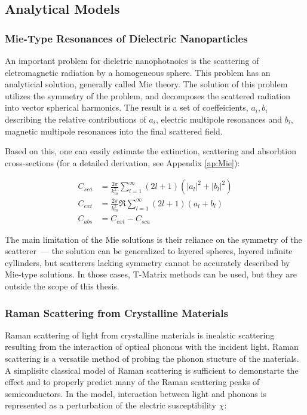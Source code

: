     \subsection{Analytical Models}
        \subsubsection{Mie-Type Resonances of Dielectric Nanoparticles}
                An important problem for dieletric nanophotnoics is the scattering of eletromagnetic radiation by
            a homogeneous sphere. This problem has an analyticial solution, generally called Mie theory\cite{mie1908beitrage}.
            The solution of this problem utilizes the symmetry of the problem, and decomposes the scattered radiation into
            vector spherical harmonics. The result is a set of coeffeicients, $a_i, b_i$ describing the relative contributions
            of $a_i$, electric multipole resonances and $b_i$, magnetic multipole resonances into the final scattered field.

                Based on this, one can easily estimate the extinction, scattering and absorbtion cross-sections (for a detailed
                derivation, see Appendix \ref{ap:Mie}):

            \begin{align}
                C_{sca} &= \frac{2\pi}{k^2_m}\sum_{l=1}^\infty (2l +1)(|a_l|^2 + |b_l|^2)\\
                C_{ext} &= \frac{2\pi}{k^2_m}\Re\sum_{l=1}^\infty (2l +1)(a_l + b_l)\\
                C_{abs} &= C_{ext} - C_{sca}
            \end{align}

                The main limitation of the Mie solutions is their reliance on the symmetry of the scatterer~--- the solution can
            be generalized to layered spheres, layered  infinite cyllinders, but scatterers lacking symmetry cannot be accurately described
            by Mie-type solutions. In those cases, T-Matrix methods can be used, but they are outside the scope of this thesis.

        \subsubsection{Raman Scattering from Crystalline Materials}
                Raman scattering of light from crystalline materials is inealstic scattering resulting from the interaction of optical phonons with
            the incident light. Raman scattering is a versatile method of probing the phonon stucture of the materials.
            A simplisitc classical model of Raman scattering is sufficient to demonstarte the effect and to properly predict many of the
            Raman scattering peaks of semiconductors\cite{peter2010fundamentals}. In the model, interaction between light and phonons
            is represented as a perturbation of the electric susceptibility $\chi$:

